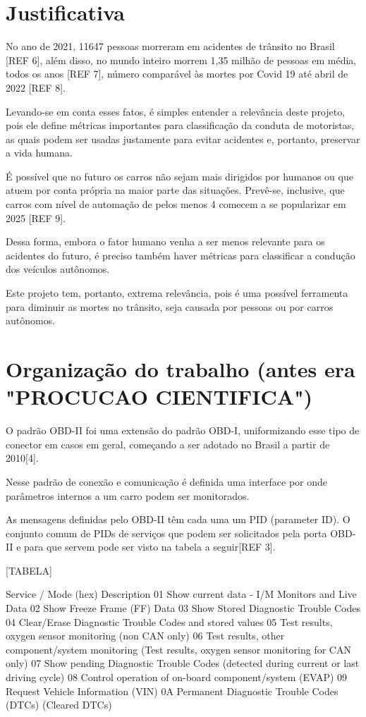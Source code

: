  
\section{Justificativa}
No ano de 2021, 11647 pessoas morreram em acidentes de trânsito no Brasil [REF 6], além disso, no mundo inteiro morrem 1,35 milhão de pessoas em média, todos os anos [REF 7], número comparável às mortes por Covid 19 até abril de 2022 [REF 8].

Levando-se em conta esses fatos, é simples entender a relevância deste projeto, pois ele define métricas importantes para classificação da conduta de motoristas, as quais podem ser usadas justamente para evitar acidentes e, portanto, preservar a vida humana.

É possível que no futuro os carros não sejam mais dirigidos por humanos ou que atuem por conta própria na maior parte das situações. Prevê-se, inclusive, que carros com nível de automação de pelos menos 4 comecem a se popularizar em 2025 [REF 9].

Dessa forma, embora o fator humano venha a ser menos relevante para os acidentes do futuro, é preciso também haver métricas para classificar a condução dos veículos autônomos.

Este projeto tem, portanto, extrema relevância, pois é uma possível ferramenta para diminuir as mortes no trânsito, seja causada por pessoas ou por carros autônomos.

\section{Organização do trabalho (antes era "PROCUCAO CIENTIFICA")}

O padrão OBD-II foi uma extensão do padrão OBD-I, uniformizando esse tipo de conector em casos em geral, começando a ser adotado no Brasil a partir de 2010[4].

Nesse padrão de conexão e comunicação é definida uma interface por onde parâmetros internos a um carro podem ser monitorados.

As mensagens definidas pelo OBD-II têm cada uma um PID (parameter ID). O conjunto comum de PIDs de serviços que podem ser solicitados pela porta OBD-II e para que servem pode ser visto na tabela a seguir[REF 3].

[TABELA]

Service / Mode (hex)
Description
01
Show current data - I/M Monitors and Live Data
02
Show Freeze Frame (FF) Data
03
Show Stored Diagnostic Trouble Codes
04
Clear/Erase Diagnostic Trouble Codes and stored values
05
Test results, oxygen sensor monitoring (non CAN only)
06
Test results, other component/system monitoring (Test results, oxygen sensor monitoring for CAN only)
07
Show pending Diagnostic Trouble Codes (detected during current or last driving cycle)
08
Control operation of on-board component/system (EVAP)
09
Request Vehicle Information (VIN)
0A
Permanent Diagnostic Trouble Codes (DTCs) (Cleared DTCs)

